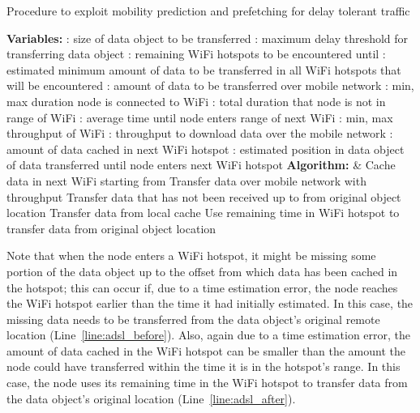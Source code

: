 \documentclass{sig-alternate}
\begin{document}
\newcommand{\tnext}{\mbox{\emph {\tiny next}}}
\newcommand{\Offset}{\mbox{\emph {Offset}}}

\renewcommand{\algorithmiccomment}[1]{/* #1 */}




\begin{algorithm}
\caption{Procedure to exploit mobility prediction and prefetching for delay tolerant traffic}
\begin{algorithmic}[1]
\label{alg:delaytolerant}
{\scriptsize
\STATE \textbf{Variables:}
\STATE : size of data object to be transferred
\STATE : maximum delay threshold for transferring data object
\STATE : remaining  WiFi hotspots to be encountered until 
\STATE : estimated minimum amount of data to be transferred in all WiFi hotspots that will be encountered
\STATE : amount of data  to be transferred over mobile network
\STATE : min, max duration node is connected  to WiFi  
\STATE : total duration that node is not in range of WiFi
\STATE : average time until node enters range of next WiFi
\STATE : min, max throughput of WiFi  
\STATE : throughput to download data over the mobile network
\STATE : amount of data cached  in next WiFi hotspot
\STATE : estimated position in data object of data transferred until node enters next WiFi hotspot
\STATE \textbf{Algorithm:}
 \label{line:mobile}
\STATE   \label{line:datawifi}
\STATE  \label{line:timewifi}
\STATE   \&  \label{line:datatimemobile}
\STATE  \label{line:thrmobile}
\STATE  \label{line:cache}
\STATE  \label{line:offset}
\STATE Cache  data in next WiFi starting from 
\STATE Transfer data over mobile network with throughput 
 \label{line:wifi}
\STATE Transfer data that has not been received up to  from original object location \label{line:adsl_before}
\STATE Transfer data from  local cache
\STATE Use remaining time in WiFi hotspot to transfer data from original object location \label{line:adsl_after}
\ENDIF
\label{line:1end}
\\ }
\end{algorithmic}
\end{algorithm}



Note that when the node enters a WiFi hotspot, it might be missing some portion of the data object up to the offset from which  data has been cached in the hotspot; this can occur if, due to a time estimation error, the node reaches the WiFi hotspot earlier than the time it had initially estimated.
In this case, the missing data needs to be transferred from the data object's original remote location (Line~\ref{line:adsl_before}). Also, again due to a time estimation error, the amount of data cached in the WiFi hotspot can be smaller than the amount the node could have transferred within the time it is in the   hotspot's range. In this  case, the node uses its remaining time in the WiFi hotspot to transfer data from the data object's original location (Line~\ref{line:adsl_after}).
\end{document}
